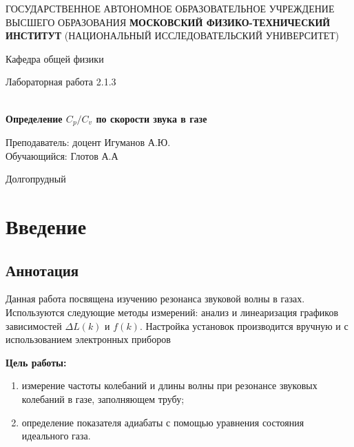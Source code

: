 \documentclass[12pt,a4paper]{article}
\author{Глотов Алексей}
\begin{document}
\newpage
\begin{center}
\footnotesize{{ГОСУДАРСТВЕННОЕ АВТОНОМНОЕ ОБРАЗОВАТЕЛЬНОЕ УЧРЕЖДЕНИЕ}\break
{ВЫСШЕГО ОБРАЗОВАНИЯ}
\break
{\bf {МОСКОВСКИЙ ФИЗИКО-ТЕХНИЧЕСКИЙ ИНСТИТУТ}}
\break
\small{(НАЦИОНАЛЬНЫЙ ИССЛЕДОВАТЕЛЬСКИЙ УНИВЕРСИТЕТ)}}
\break
\hfill \break
\hfill \break
\begin{center}
\normalsize{Кафедра общей физики}
\end{center}
\hfill \break
\hfill \break
\hfill \break
\hfill \break

\begin{center}
\normalsize {Лабораторная работа 2.1.3}
\end{center}
\hfill \break\\
\large{\textbf{Определение $C_{p}/C_{v}$ по скорости звука в газе}}
\end{center}
\begin{flushleft}
\hfill \break
\hfill \break
\hfill \break
\hfill \break
\hfill \break
\hfill \break
\hfill \break
\hfill \break
\hfill \break
\hfill \break
\hangindent=9cm
\normalsize{Преподаватель:}\hfill
\normalsize{доцент Игуманов А.Ю.}\\
\hfill \break
\normalsize{Обучающийся:}\hfill
\normalsize{Глотов А.А} \\
\hfill \break
\end{flushleft}
\hfill \break
\hfill \break
\hfill \break
\hfill \break
\hfill \break
\hfill \break
\hfill \break
\hfill \break
\hfill \break
\hfill \break
\hfill \break

\begin{center}
Долгопрудный 
\end{center}
\thispagestyle{empty}
\section{Введение}
\subsection{Аннотация}

Данная работа посвящена изучению резонанса звуковой волны в газах. Используются следующие методы измерений: анализ и линеаризация графиков зависимостей $\Delta{L}(k)$ и $f(k)$. Настройка установок производится вручную и с использованием электронных приборов

\textbf{Цель работы:}  \begin{enumerate}
\item измерение частоты колебаний и длины волны при резонансе звуковых колебаний в газе, заполняющем трубу;
\item определение показателя адиабаты с помощью уравнения состояния идеального газа.
\end{enumerate}
\end{document}
